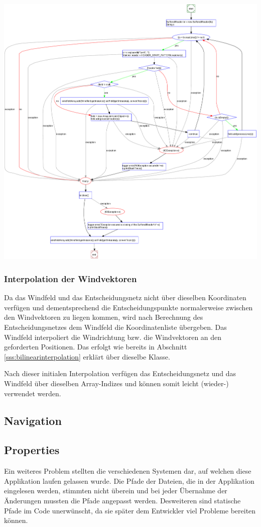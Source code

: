 \begin{center}
 \includegraphics[width=0.8\linewidth]{img/ControlFlowGraph-SpaceWindFieldLoader-read}
\end{center}



\subsubsection{Interpolation der Windvektoren}
Da das Windfeld und das Entscheidungsnetz nicht über dieselben Koordinaten
verfügen und dementsprechend die Entscheidungspunkte normalerweise zwischen den
Windvektoren zu liegen kommen, wird nach Berechnung des Entscheidungsnetzes dem
Windfeld die Koordinatenliste übergeben. Das Windfeld interpoliert die
Windrichtung bzw. die Windvektoren an den geforderten Positionen. Das erfolgt
wie bereits in Abschnitt \ref{sss:bilinearinterpolation} erklärt über dieselbe
Klasse.

Nach dieser initialen Interpolation verfügen das Entscheidungsnetz und das
Windfeld über dieselben Array-Indizes und können somit leicht (wieder-)
verwendet werden.

\subsection{Navigation}


\subsection{Properties}
Ein weiteres Problem stellten die verschiedenen Systemen dar, auf welchen
diese Applikation laufen gelassen wurde. Die Pfade der Dateien, die in der
Applikation eingelesen werden, stimmten nicht überein und bei jeder Übernahme
der Änderungen mussten die Pfade angepasst werden. Desweiteren sind statische
Pfade im Code unerwünscht, da sie später dem Entwickler viel Probleme bereiten
können. 

